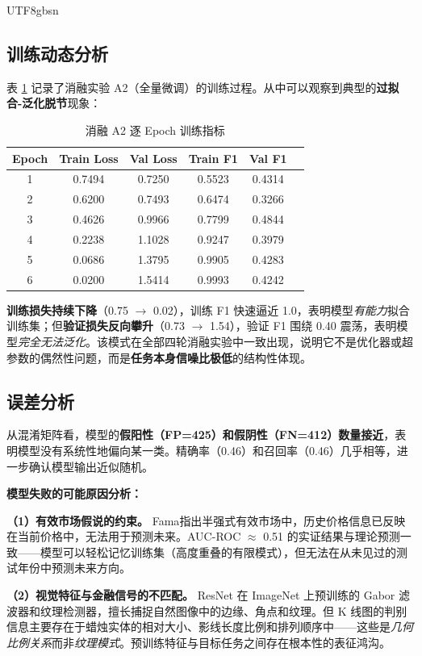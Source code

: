 \documentclass[12pt,a4paper]{article}
\begin{document}
\begin{CJK}{UTF8}{gbsn}
\subsection{训练动态分析}

表 \ref{tab:training_dynamics} 记录了消融实验 A2（全量微调）的训练过程。从中可以观察到典型的\textbf{过拟合-泛化脱节}现象：

\begin{table}[H]
\centering
\caption{消融 A2 逐 Epoch 训练指标}
\label{tab:training_dynamics}
\begin{tabular}{cccccc}
\toprule
\textbf{Epoch} & \textbf{Train Loss} & \textbf{Val Loss} & \textbf{Train F1} & \textbf{Val F1} \\
\midrule
1 & 0.7494 & 0.7250 & 0.5523 & 0.4314 \\
2 & 0.6200 & 0.7493 & 0.6474 & 0.3266 \\
3 & 0.4626 & 0.9966 & 0.7799 & 0.4844 \\
4 & 0.2238 & 1.1028 & 0.9247 & 0.3979 \\
5 & 0.0686 & 1.3795 & 0.9905 & 0.4283 \\
6 & 0.0200 & 1.5414 & 0.9993 & 0.4242 \\
\bottomrule
\end{tabular}
\end{table}

\textbf{训练损失持续下降}（0.75 $\to$ 0.02），训练 F1 快速逼近 1.0，表明模型\emph{有能力}拟合训练集；但\textbf{验证损失反向攀升}（0.73 $\to$ 1.54），验证 F1 围绕 0.40 震荡，表明模型\emph{完全无法泛化}。该模式在全部四轮消融实验中一致出现，说明它不是优化器或超参数的偶然性问题，而是\textbf{任务本身信噪比极低}的结构性体现。

\subsection{误差分析}

从混淆矩阵看，模型的\textbf{假阳性（FP=425）和假阴性（FN=412）数量接近}，表明模型没有系统性地偏向某一类。精确率（0.46）和召回率（0.46）几乎相等，进一步确认模型输出近似随机。

\textbf{模型失败的可能原因分析：}

\textbf{（1）有效市场假说的约束。} Fama\cite{fama1970}指出半强式有效市场中，历史价格信息已反映在当前价格中，无法用于预测未来。AUC-ROC $\approx$ 0.51 的实证结果与理论预测一致——模型可以轻松记忆训练集（高度重叠的有限模式），但无法在从未见过的测试年份中预测未来方向。

\textbf{（2）视觉特征与金融信号的不匹配。} ResNet 在 ImageNet 上预训练的 Gabor 滤波器和纹理检测器，擅长捕捉自然图像中的边缘、角点和纹理。但 K 线图的判别信息主要存在于蜡烛实体的相对大小、影线长度比例和排列顺序中——这些是\emph{几何比例关系}而非\emph{纹理模式}。预训练特征与目标任务之间存在根本性的表征鸿沟。


\end{CJK}
\end{document}
